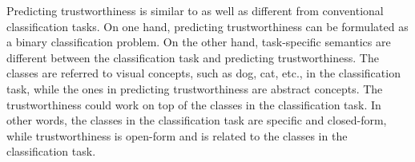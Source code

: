 

Predicting trustworthiness is similar to as well as different from conventional classification tasks.
On one hand, predicting trustworthiness can be formulated as a binary classification problem.
On the other hand, task-specific semantics are different between the classification task and predicting trustworthiness.
The classes are referred to visual concepts, such as dog, cat, etc., in the classification task, while the ones in predicting trustworthiness are abstract concepts. %
The trustworthiness could work on top of the classes in the classification task.
In other words, the classes in the classification task are specific and closed-form, while trustworthiness is open-form and is related to the classes in the classification task.




